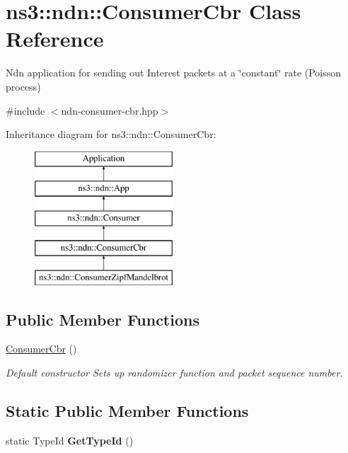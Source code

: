 \hypertarget{classns3_1_1ndn_1_1ConsumerCbr}{}\section{ns3\+:\+:ndn\+:\+:Consumer\+Cbr Class Reference}
\label{classns3_1_1ndn_1_1ConsumerCbr}


Ndn application for sending out Interest packets at a \char`\"{}constant\char`\"{} rate (Poisson process)  




{\ttfamily \#include $<$ndn-\/consumer-\/cbr.\+hpp$>$}

Inheritance diagram for ns3\+:\+:ndn\+:\+:Consumer\+Cbr\+:\begin{figure}[H]
\begin{center}
\leavevmode
\includegraphics[height=5.000000cm]{classns3_1_1ndn_1_1ConsumerCbr}
\end{center}
\end{figure}
\subsection*{Public Member Functions}
\begin{DoxyCompactItemize}
\item 
\hyperlink{classns3_1_1ndn_1_1ConsumerCbr_a3db86ee504c87a06c7a972706f0cd5ff}{Consumer\+Cbr} ()\hypertarget{classns3_1_1ndn_1_1ConsumerCbr_a3db86ee504c87a06c7a972706f0cd5ff}{}\label{classns3_1_1ndn_1_1ConsumerCbr_a3db86ee504c87a06c7a972706f0cd5ff}

\begin{DoxyCompactList}\small\item\em Default constructor Sets up randomizer function and packet sequence number. \end{DoxyCompactList}\end{DoxyCompactItemize}
\subsection*{Static Public Member Functions}
\begin{DoxyCompactItemize}
\item 
static Type\+Id {\bfseries Get\+Type\+Id} ()\hypertarget{classns3_1_1ndn_1_1ConsumerCbr_aceb273c0a5cf6c83028eaca72041f691}{}\label{classns3_1_1ndn_1_1ConsumerCbr_aceb273c0a5cf6c83028eaca72041f691}

\end{DoxyCompactItemize}
